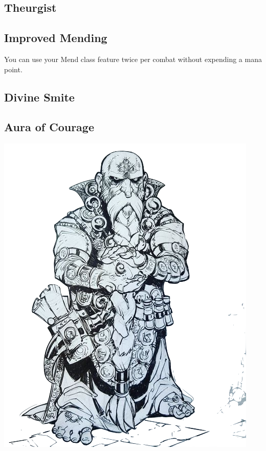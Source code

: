 
\begin{multicols*}{2}

\section{Theurgist}

\subsection*{Improved Mending}

You can use your Mend class feature twice per combat without expending a mana point.

\subsection*{Divine Smite}

\subsection*{Aura of Courage}




\begin{Figure}
\centering
\includegraphics[width=\textwidth]{img/cleric.png}
\end{Figure}
    
\end{multicols*}

    
